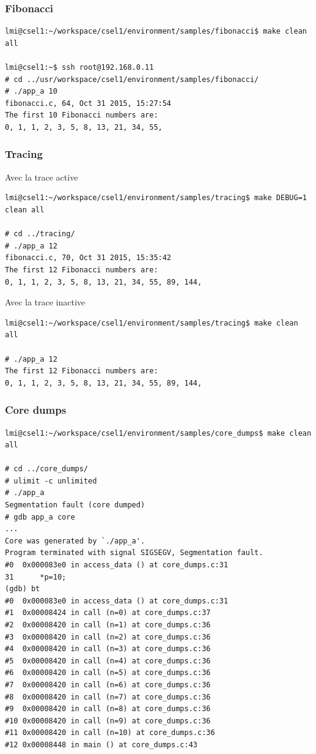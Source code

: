 \subsubsection{Fibonacci}
\begin{lstlisting}
lmi@csel1:~/workspace/csel1/environment/samples/fibonacci$ make clean all

lmi@csel1:~$ ssh root@192.168.0.11
# cd ../usr/workspace/csel1/environment/samples/fibonacci/
# ./app_a 10
fibonacci.c, 64, Oct 31 2015, 15:27:54
The first 10 Fibonacci numbers are:
0, 1, 1, 2, 3, 5, 8, 13, 21, 34, 55,
\end{lstlisting}

\subsubsection{Tracing}
Avec la trace active
\begin{lstlisting}
lmi@csel1:~/workspace/csel1/environment/samples/tracing$ make DEBUG=1 clean all

# cd ../tracing/
# ./app_a 12
fibonacci.c, 70, Oct 31 2015, 15:35:42
The first 12 Fibonacci numbers are:
0, 1, 1, 2, 3, 5, 8, 13, 21, 34, 55, 89, 144, 
\end{lstlisting}
Avec la trace inactive
\begin{lstlisting}
lmi@csel1:~/workspace/csel1/environment/samples/tracing$ make clean all

# ./app_a 12
The first 12 Fibonacci numbers are:
0, 1, 1, 2, 3, 5, 8, 13, 21, 34, 55, 89, 144, 
\end{lstlisting}

\subsubsection{Core dumps}
\begin{lstlisting}
lmi@csel1:~/workspace/csel1/environment/samples/core_dumps$ make clean all

# cd ../core_dumps/
# ulimit -c unlimited
# ./app_a 
Segmentation fault (core dumped)
# gdb app_a core
...
Core was generated by `./app_a'.
Program terminated with signal SIGSEGV, Segmentation fault.
#0  0x000083e0 in access_data () at core_dumps.c:31
31		*p=10;
(gdb) bt
#0  0x000083e0 in access_data () at core_dumps.c:31
#1  0x00008424 in call (n=0) at core_dumps.c:37
#2  0x00008420 in call (n=1) at core_dumps.c:36
#3  0x00008420 in call (n=2) at core_dumps.c:36
#4  0x00008420 in call (n=3) at core_dumps.c:36
#5  0x00008420 in call (n=4) at core_dumps.c:36
#6  0x00008420 in call (n=5) at core_dumps.c:36
#7  0x00008420 in call (n=6) at core_dumps.c:36
#8  0x00008420 in call (n=7) at core_dumps.c:36
#9  0x00008420 in call (n=8) at core_dumps.c:36
#10 0x00008420 in call (n=9) at core_dumps.c:36
#11 0x00008420 in call (n=10) at core_dumps.c:36
#12 0x00008448 in main () at core_dumps.c:43
\end{lstlisting}


